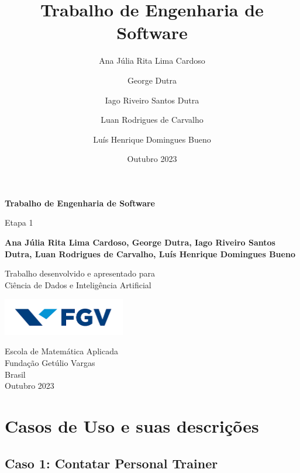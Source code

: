 \documentclass{article}
\title{Trabalho de Engenharia de Software}
\author{Ana Júlia Rita Lima Cardoso \and George Dutra \and Iago Riveiro Santos Dutra \and Luan Rodrigues de Carvalho \and Luís Henrique Domingues Bueno}
\date{Outubro 2023}
\begin{document}
\begin{titlepage}
    \begin{center}
        \vspace*{1cm}
            
        \Huge
        \textbf{Trabalho de Engenharia de Software}
            
        \vspace{0.5cm}
        \LARGE
        Etapa 1
            
        \vspace{1.5cm}
            
        \textbf{Ana Júlia Rita Lima Cardoso, George Dutra, Iago Riveiro Santos Dutra, Luan Rodrigues de Carvalho, Luís Henrique Domingues Bueno}
            
        \vfill
            
        Trabalho desenvolvido e apresentado para\\
        Ciência de Dados e Inteligência Artificial
            
        \vspace{0.8cm}
            
        \includegraphics[width=0.4\textwidth]{Logo FGV.png}
            
        \Large
        Escola de Matemática Aplicada\\
        Fundação Getúlio Vargas\\
        Brasil\\
        Outubro 2023
            
    \end{center}
\end{titlepage}
\newpage

\tableofcontents
\newpage

\section{Casos de Uso e suas descrições}

\subsection{Caso 1: Contatar Personal Trainer}
\end{document}
